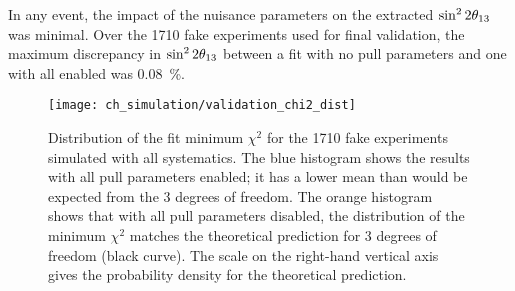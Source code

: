 In any event, the impact of the nuisance parameters
on the extracted $\sin^22\theta_{13}{}$ was minimal.
Over the 1710 fake experiments used for final validation, the maximum discrepancy in $\sin^22\theta_{13}{}$
between a fit with no pull parameters and one with all enabled
was \SI{0.08}{\percent}.

\begin{figure}
    \centering
    \texttt{[image: ch\_simulation/validation\_chi2\_dist]}
    \caption[Fitter validation $\chi^2$ distribution]{
        Distribution of the fit minimum $\chi^2$
        for the \num{1710} fake experiments
        simulated with all systematics.
        The blue histogram shows the results with all pull parameters enabled;
        it has a lower mean than would be expected from the 3 degrees of freedom.
        The orange histogram shows that with all pull parameters disabled,
        the distribution of the minimum $\chi^2$ matches the theoretical prediction
        for 3 degrees of freedom (black curve).
        The scale on the right-hand vertical axis gives the probability density
        for the theoretical prediction.
    }
    \label{fig:validation_chi2}
\end{figure}

